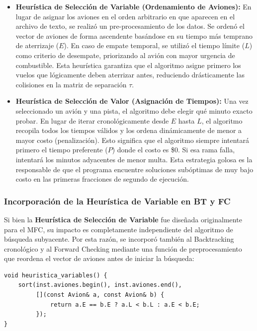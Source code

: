 \documentclass[12pt]{article}
\begin{document}
\begin{itemize}
    \item \textbf{Heurística de Selección de Variable (Ordenamiento de Aviones):} En lugar de asignar los aviones en el orden arbitrario en que aparecen en el archivo de texto, se realizó un pre-procesamiento de los datos. Se ordenó el vector de aviones de forma ascendente basándose en su tiempo más temprano de aterrizaje ($E$). En caso de empate temporal, se utilizó el tiempo límite ($L$) como criterio de desempate, priorizando al avión con mayor urgencia de combustible. Esta heurística garantiza que el algoritmo asigne primero los vuelos que lógicamente deben aterrizar antes, reduciendo drásticamente las colisiones en la matriz de separación $\tau$.
    \item \textbf{Heurística de Selección de Valor (Asignación de Tiempos):} Una vez seleccionado un avión y una pista, el algoritmo debe elegir qué minuto exacto probar. En lugar de iterar cronológicamente desde $E$ hasta $L$, el algoritmo recopila todos los tiempos válidos y los ordena dinámicamente de menor a mayor costo (penalización). Esto significa que el algoritmo siempre intentará primero el tiempo preferente ($P$) donde el costo es \$0. Si esa rama falla, intentará los minutos adyacentes de menor multa. Esta estrategia golosa es la responsable de que el programa encuentre soluciones subóptimas de muy bajo costo en las primeras fracciones de segundo de ejecución.
\end{itemize}

\subsubsection{Incorporación de la Heurística de Variable en BT y FC}

Si bien la \textbf{Heurística de Selección de Variable} fue diseñada originalmente para el MFC, su impacto es completamente independiente del algoritmo de búsqueda subyacente. Por esta razón, se incorporó también al Backtracking cronológico y al Forward Checking mediante una función de preprocesamiento que reordena el vector de aviones antes de iniciar la búsqueda:

\begin{verbatim}
void heuristica_variables() {
    sort(inst.aviones.begin(), inst.aviones.end(),
         [](const Avion& a, const Avion& b) {
             return a.E == b.E ? a.L < b.L : a.E < b.E;
         });
}
\end{verbatim}
\end{document}
